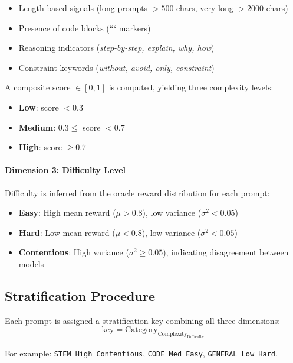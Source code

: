 \begin{itemize}
    \item Length-based signals (long prompts $>500$ chars, very long $>2000$ chars)
    \item Presence of code blocks (``` markers)
    \item Reasoning indicators (\textit{step-by-step, explain, why, how})
    \item Constraint keywords (\textit{without, avoid, only, constraint})
\end{itemize}

A composite score $\in [0, 1]$ is computed, yielding three complexity levels:
\begin{itemize}
    \item \textbf{Low}: score $< 0.3$
    \item \textbf{Medium}: $0.3 \leq$ score $< 0.7$
    \item \textbf{High}: score $\geq 0.7$
\end{itemize}

\paragraph{Dimension 3: Difficulty Level}
Difficulty is inferred from the oracle reward distribution for each prompt:

\begin{itemize}
    \item \textbf{Easy}: High mean reward ($\mu > 0.8$), low variance ($\sigma^2 < 0.05$)
    \item \textbf{Hard}: Low mean reward ($\mu < 0.8$), low variance ($\sigma^2 < 0.05$)
    \item \textbf{Contentious}: High variance ($\sigma^2 \geq 0.05$), indicating disagreement between models
\end{itemize}

\subsection{Stratification Procedure}

Each prompt is assigned a stratification key combining all three dimensions:
\begin{equation}
\text{key} = \text{Category}_{\text{Complexity}}_{\text{Difficulty}}
\end{equation}

For example: \texttt{STEM\_High\_Contentious}, \texttt{CODE\_Med\_Easy}, \texttt{GENERAL\_Low\_Hard}.

